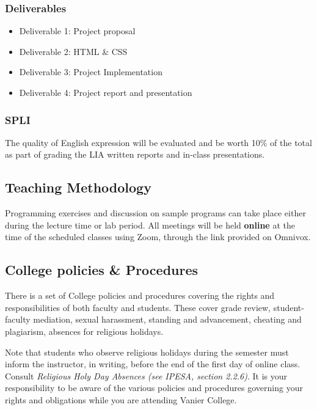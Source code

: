 \documentclass[
  10pt,
]{article}
\providecommand{\tightlist}{%
  \setlength{\itemsep}{0pt}\setlength{\parskip}{0pt}}
\begin{document}
\hypertarget{deliverables}{%
\subsubsection*{Deliverables}\label{deliverables}}

\begin{itemize}
\tightlist
\item
  Deliverable 1: Project proposal
\item
  Deliverable 2: HTML \& CSS
\item
  Deliverable 3: Project Implementation
\item
  Deliverable 4: Project report and presentation
\end{itemize}

\hypertarget{spli}{%
\subsubsection*{SPLI}\label{spli}}

The quality of English expression will be evaluated and be worth 10\% of
the total as part of grading the LIA written reports and in-class
presentations.

\hypertarget{teaching-methodology}{%
\subsection*{Teaching Methodology}\label{teaching-methodology}}

Programming exercises and discussion on sample programs can take place
either during the lecture time or lab period. All meetings will be held
\textbf{online} at the time of the scheduled classes using Zoom, through
the link provided on Omnivox.

\hypertarget{college-policies-procedures}{%
\subsection*{College policies \&
Procedures}\label{college-policies-procedures}}

There is a set of College policies and procedures covering the rights
and responsibilities of both faculty and students. These cover grade
review, student-faculty mediation, sexual harassment, standing and
advancement, cheating and plagiarism, absences for religious holidays.

Note that students who observe religious holidays during the semester
must inform the instructor, in writing, before the end of the first day
of online class. Consult \emph{Religious Holy Day Absences (see IPESA,
section 2.2.6)}. It is your responsibility to be aware of the various
policies and procedures governing your rights and obligations while you
are attending Vanier College.
\end{document}
